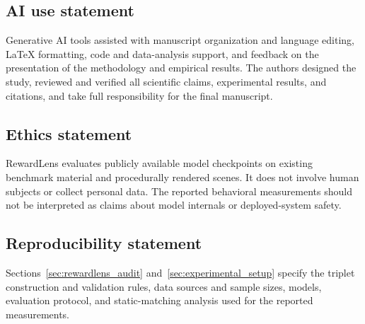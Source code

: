 \documentclass{article}
\providecommand{\BibliographyFiles}{references}
\begin{document}









\subsection*{AI use statement}

Generative AI tools assisted with manuscript organization and language editing,
\LaTeX{} formatting, code and data-analysis support, and feedback on the
presentation of the methodology and empirical results. The authors designed the
study, reviewed and verified all scientific claims, experimental results, and
citations, and take full responsibility for the final manuscript.

\subsection*{Ethics statement}

RewardLens evaluates publicly available model checkpoints on existing
benchmark material and procedurally rendered scenes. It does not involve human
subjects or collect personal data. The reported behavioral measurements should
not be interpreted as claims about model internals or deployed-system safety.

\subsection*{Reproducibility statement}

Sections~\ref{sec:rewardlens_audit} and~\ref{sec:experimental_setup} specify
the triplet construction and validation rules, data sources and sample sizes,
models, evaluation protocol, and static-matching analysis used for the reported
measurements.


\clearpage
\begingroup
\setlength{\emergencystretch}{3em}
\raggedright
\sloppy


\endgroup

\clearpage
\appendix

\clearpage

\clearpage
\end{document}
